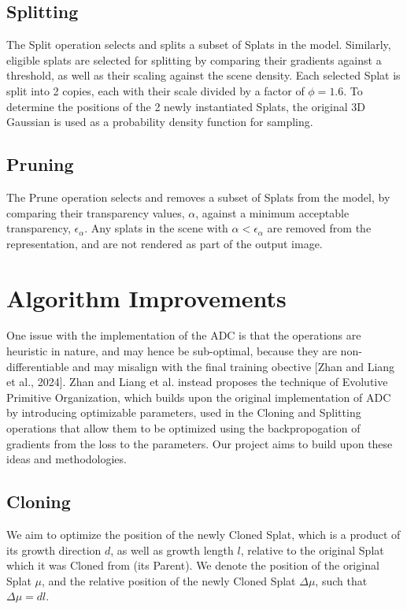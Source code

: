 \documentclass[11pt]{report}
\begin{document}
\subsection{Splitting}
The Split operation selects and splits a subset of Splats in the model. Similarly, eligible splats are selected for splitting by comparing their gradients against a threshold, as well as their scaling against the scene density. Each selected Splat is split into 2 copies, each with their scale divided by a factor of $\phi = 1.6$. To determine the positions of the 2 newly instantiated Splats, the original 3D Gaussian is used as a probability density function for sampling.

\subsection{Pruning}
The Prune operation selects and removes a subset of Splats from the model, by comparing their transparency values, $\alpha$, against a minimum acceptable transparency, $\epsilon_{\alpha}$. Any splats in the scene with $\alpha < \epsilon_{\alpha}$ are removed from the representation, and are not rendered as part of the output image.

\section{Algorithm Improvements}
One issue with the implementation of the ADC is that the operations are heuristic in nature, and may hence be sub-optimal, because they are non-differentiable and may misalign with the final training obective [Zhan and Liang et al., 2024]. Zhan and Liang et al. instead proposes the technique of Evolutive Primitive Organization, which builds upon the original implementation of ADC by introducing optimizable parameters, used in the Cloning and Splitting operations that allow them to be optimized using the backpropogation of gradients from the loss to the parameters. Our project aims to build upon these ideas and methodologies.

\subsection{Cloning}
We aim to optimize the position of the newly Cloned Splat, which is a product of its growth direction $d$, as well as growth length $l$, relative to the original Splat which it was Cloned from (its Parent). We denote the position of the original Splat $\mu$, and the relative position of the newly Cloned Splat $\Delta \mu$, such that $\Delta \mu = dl$.
\end{document}

